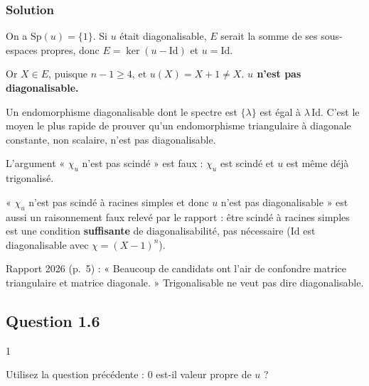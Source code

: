 \documentclass[11pt,a4paper]{article}
\begin{document}
\hypertarget{solution-4}{%
\subsubsection{Solution}\label{solution-4}}

On a \(\mathrm{Sp}(u)=\{1\}\). Si \(u\) était diagonalisable, \(E\) serait la somme de ses sous-espaces propres, donc \(E=\ker(u-\mathrm{Id})\) et \(u=\mathrm{Id}\).

Or \(X\in E\), puisque \(n-1\ge 4\), et \(u(X)=X+1\ne X\). \textbf{\(u\) n'est pas diagonalisable.}

\begin{methode}

Un endomorphisme diagonalisable dont le spectre est \(\{\lambda\}\) est égal à \(\lambda\,\mathrm{Id}\). C'est le moyen le plus rapide de prouver qu'un endomorphisme triangulaire à diagonale constante, non scalaire, n'est pas diagonalisable.

\end{methode}

\begin{piege}

L'argument « \(\chi_u\) n'est pas scindé » est faux : \(\chi_u\) est scindé et \(u\) est même déjà trigonalisé.

« \(\chi_u\) n'est pas scindé à racines simples et donc \(u\) n'est pas diagonalisable » est aussi un raisonnement faux relevé par le rapport : être scindé à racines simples est une condition \textbf{suffisante} de diagonalisabilité, pas nécessaire (\(\mathrm{Id}\) est diagonalisable avec \(\chi=(X-1)^n\)).

\end{piege}

\begin{jury}

Rapport 2026 (p.~5) : « Beaucoup de candidats ont l'air de confondre matrice triangulaire et matrice diagonale. » Trigonalisable ne veut pas dire diagonalisable.

\end{jury}

\hypertarget{question-1.6}{%
\subsection{Question 1.6}\label{question-1.6}}

\begin{indication}{1}

Utilisez la question précédente : \(0\) est-il valeur propre de \(u\) ?

\end{indication}
\end{document}
